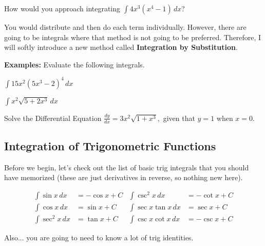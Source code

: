 \documentclass[addpoints, 12pt]{exam}
\begin{document}
How would you approach integrating $\displaystyle\int 4x^3\left(x^4-1\right)\,dx$?

You would distribute and then do each term individually. However, there are going to be integrals where that method is not going to be preferred. Therefore, I will softly introduce a new method called \textbf{Integration by Substitution}.

\noindent\textbf{Examples:} Evaluate the following integrals.
\begin{questions}
    \question $\displaystyle\int15x^2(5x^3-2)^4\,dx$
    
    \question $\displaystyle\int x^2\sqrt{5+2x^3}\,dx$
    
    Solve the Differential Equation
    \question $\displaystyle\frac{dy}{dx}=3x^2\sqrt{1+x^3},$ given that $y=1$ when $x=0$.
\end{questions}



\newpage
{}
\subsection*{Integration of Trigonometric Functions}
Before we begin, let's check out the list of basic trig integrals that you should have memorized (these are just derivatives in reverse, so nothing new here).

\begin{tcolorbox}[title= INTEGRALS OF BASIC TRIG FUNCTIONS,colframe=black,sharp corners,colback=white,colbacktitle=white,coltitle=black,boxrule=1pt]

    \begin{align*}
        \int\sin x\,dx &= -\cos x+C & \int\csc^2 x\,dx &= -\cot x+C\\
        \int\cos x\,dx &= \sin x+C & \int\sec x\tan x\,dx &= \sec x+C\\
        \int\sec^2 x\,dx &= \tan x+C & \int\csc x\cot x\,dx &= -\csc x+C
    \end{align*}
    \vspace{.05cm}
\end{tcolorbox}
Also... you are going to need to know a lot of trig identities.
\end{document}

